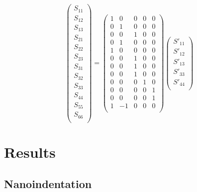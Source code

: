 \documentclass[a4paper,fleqn]{DC_ArtStyle}
\begin{document}
	\begin{equation}
		\begin{pmatrix}
		S_{11} \\
		S_{12} \\
		S_{13} \\
		S_{21} \\
		S_{22} \\
		S_{23} \\
		S_{31} \\
		S_{32} \\
		S_{33} \\
		S_{44} \\
		S_{55} \\
		S_{66} \\
		\end{pmatrix} = \begin{pmatrix}
		1 & 0 & 0 & 0 & 0\\
		0 & 1 & 0 & 0 & 0\\
		0 & 0 & 1 & 0 & 0\\
		0 & 1 & 0 & 0 & 0\\
		1 & 0 & 0 & 0 & 0\\
		0 & 0 & 1 & 0 & 0\\
		0 & 0 & 1 & 0 & 0\\
		0 & 0 & 1 & 0 & 0\\
		0 & 0 & 0 & 1 & 0\\
		0 & 0 & 0 & 0 & 1\\
		0 & 0 & 0 & 0 & 1\\
		1 &-1 & 0 & 0 & 0\\
		\end{pmatrix} \begin{pmatrix}
		S'_{11} \\
		S'_{12} \\
		S'_{13} \\
		S'_{33} \\
		S'_{44} \\
		\end{pmatrix}
		\label{EqFit}
	\end{equation}
	

	\clearpage
	\section{Results}
	\subsection{Nanoindentation}
	\begin{table}
		\caption{Nanoindentation - cortical bone matrix properties}
	\end{table}
\end{document}
